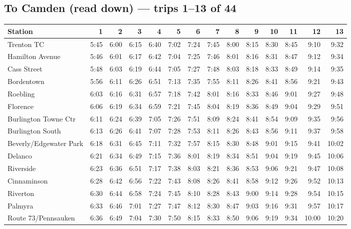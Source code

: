 \subsection*{To Camden (read down) --- trips 1--13 of 44}
\begin{center}\footnotesize\setlength{\tabcolsep}{3pt}\begin{tabular}{@{}lrrrrrrrrrrrrr@{}}\toprule
Station & 1 & 2 & 3 & 4 & 5 & 6 & 7 & 8 & 9 & 10 & 11 & 12 & 13 \\\midrule
Trenton TC & 5:45 & 6:00 & 6:15 & 6:40 & 7:02 & 7:24 & 7:45 & 8:00 & 8:15 & 8:30 & 8:45 & 9:10 & 9:32 \\
Hamilton Avenue & 5:46 & 6:01 & 6:17 & 6:42 & 7:04 & 7:25 & 7:46 & 8:01 & 8:16 & 8:31 & 8:47 & 9:12 & 9:34 \\
Cass Street & 5:48 & 6:03 & 6:19 & 6:44 & 7:05 & 7:27 & 7:48 & 8:03 & 8:18 & 8:33 & 8:49 & 9:14 & 9:35 \\
Bordentown & 5:56 & 6:11 & 6:26 & 6:51 & 7:13 & 7:35 & 7:55 & 8:11 & 8:26 & 8:41 & 8:56 & 9:21 & 9:43 \\
Roebling & 6:03 & 6:16 & 6:31 & 6:57 & 7:18 & 7:42 & 8:01 & 8:16 & 8:33 & 8:46 & 9:01 & 9:27 & 9:48 \\
Florence & 6:06 & 6:19 & 6:34 & 6:59 & 7:21 & 7:45 & 8:04 & 8:19 & 8:36 & 8:49 & 9:04 & 9:29 & 9:51 \\
Burlington Towne Ctr & 6:11 & 6:24 & 6:39 & 7:05 & 7:26 & 7:51 & 8:09 & 8:24 & 8:41 & 8:54 & 9:09 & 9:35 & 9:56 \\
Burlington South & 6:13 & 6:26 & 6:41 & 7:07 & 7:28 & 7:53 & 8:11 & 8:26 & 8:43 & 8:56 & 9:11 & 9:37 & 9:58 \\
Beverly/Edgewater Park & 6:18 & 6:31 & 6:45 & 7:11 & 7:32 & 7:57 & 8:15 & 8:30 & 8:48 & 9:01 & 9:15 & 9:41 & 10:02 \\
Delanco & 6:21 & 6:34 & 6:49 & 7:15 & 7:36 & 8:01 & 8:19 & 8:34 & 8:51 & 9:04 & 9:19 & 9:45 & 10:06 \\
Riverside & 6:23 & 6:36 & 6:51 & 7:17 & 7:38 & 8:03 & 8:21 & 8:36 & 8:53 & 9:06 & 9:21 & 9:47 & 10:08 \\
Cinnaminson & 6:28 & 6:42 & 6:56 & 7:22 & 7:43 & 8:08 & 8:26 & 8:41 & 8:58 & 9:12 & 9:26 & 9:52 & 10:13 \\
Riverton & 6:30 & 6:44 & 6:58 & 7:24 & 7:45 & 8:10 & 8:28 & 8:43 & 9:00 & 9:14 & 9:28 & 9:54 & 10:15 \\
Palmyra & 6:33 & 6:46 & 7:01 & 7:27 & 7:47 & 8:12 & 8:30 & 8:47 & 9:03 & 9:16 & 9:31 & 9:57 & 10:17 \\
Route 73/Pennsauken & 6:36 & 6:49 & 7:04 & 7:30 & 7:50 & 8:15 & 8:33 & 8:50 & 9:06 & 9:19 & 9:34 & 10:00 & 10:20 \\

\end{tabular}
\end{center}
